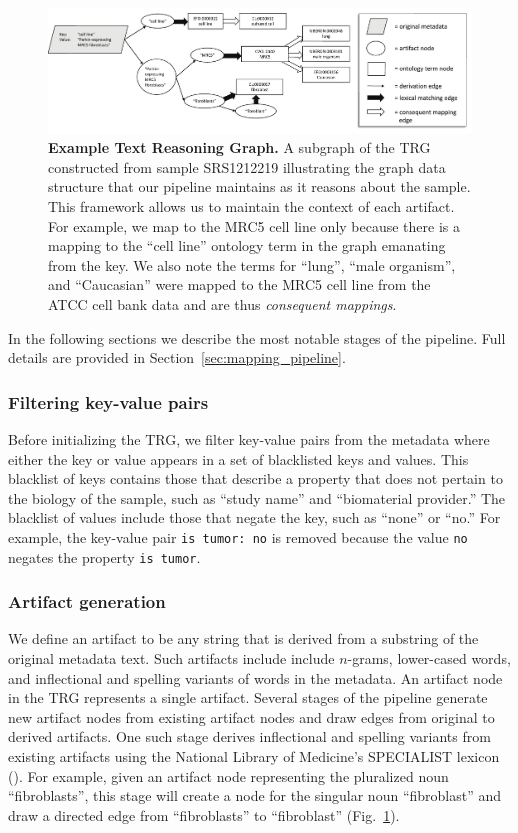 \begin{figure}
\centerline{\includegraphics[width=13cm]{figures/example_TRG.pdf}}
\caption{\textbf{Example Text Reasoning Graph.} A subgraph of the TRG constructed from sample SRS1212219 illustrating the graph data structure that our pipeline maintains as it reasons about the sample.  This framework allows us to maintain the context of each artifact. For example, we map to the MRC5 cell line only because there is a mapping to the ``cell line'' ontology term in the graph emanating from the key.  We also note the terms for ``lung'', ``male organism'', and ``Caucasian'' were mapped to the MRC5 cell line from the ATCC cell bank data and are thus \textit{consequent mappings}.}
\label{fig:example_trg}
\end{figure}

In the following sections we describe the most notable stages of the pipeline. Full details are provided in Section~\ref{sec:mapping_pipeline}.

\subsubsection{Filtering key-value pairs}

Before initializing the TRG, we filter key-value pairs from the metadata where either the key or value appears in a set of blacklisted keys and values.  This blacklist of keys contains those that describe a property that does not pertain to the biology of the sample, such as ``study name'' and ``biomaterial provider.''  The blacklist of values include those that negate the key, such as ``none'' or ``no.''  For example, the key-value pair \texttt{is tumor: no} is removed because the value \texttt{no} negates the property \texttt{is tumor}. 

\subsubsection{Artifact generation}

We define an artifact to be any string that is derived from a substring of the original metadata text.  Such artifacts include include $n$-grams, lower-cased words, and inflectional and spelling variants of words in the metadata.  An artifact node in the TRG represents a single artifact.  Several stages of the pipeline generate new artifact nodes from existing artifact nodes and draw edges from original to derived artifacts.   One such stage derives inflectional and spelling variants from existing artifacts using the National Library of Medicine's SPECIALIST lexicon (\citealp{Browne}).  For example, given an artifact node representing the pluralized noun ``fibroblasts'', this stage will create a node for the singular noun ``fibroblast'' and draw a directed edge from ``fibroblasts'' to ``fibroblast'' (Fig.~\ref{fig:example_trg}).

